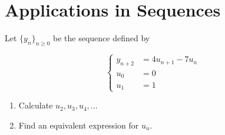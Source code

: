 	\section{Applications in Sequences}

	\begin{example}
		Let $\{y_n\}_{n \geq 0}$ be the sequence defined by

		\[\begin{cases}
			y_{n+2} &= 4u_{n+1} - 7 u_{n}\\
			u_0 &= 0\\
			u_1 &= 1
		\end{cases}\]

		\begin{enumerate}[1)]
			\item Calculate $u_2, u_3, u_4, \ldots$
			\item Find an equivalent expression for $u_n$.
		\end{enumerate}
	\end{example}

